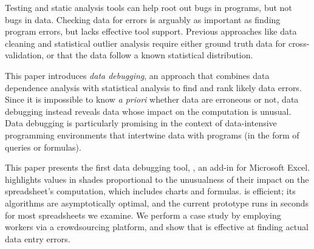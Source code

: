 Testing and static analysis tools can help root out bugs in programs,
but not bugs in data. Checking data for errors is arguably as
important as finding program errors, but lacks effective tool
support. Previous approaches like data cleaning and statistical
outlier analysis require either ground truth data for
cross-validation, or that the data follow a known statistical
distribution.

This paper introduces \emph{data debugging}, an approach that combines
data dependence analysis with statistical analysis to find and rank
likely data errors. Since it is impossible to know \emph{a priori}
whether data are erroneous or not, data debugging instead
reveals data whose impact on the computation is unusual.
Data debugging is particularly promising in the context of
data-intensive programming environments that intertwine data with
programs (in the form of queries or formulas).

This paper presents the first data debugging tool, \checkcell{}, an
add-in for Microsoft Excel. \checkcell{} highlights values in shades
proportional to the unusualness of their impact on the spreadsheet's
computation, which includes charts and formulas. \checkcell{} is efficient;
its algorithms are asymptotically optimal, and the current prototype
runs in seconds for most spreadsheets we examine. We perform a case
study by employing workers via a crowdsourcing platform, and show
that \checkcell{} is effective at finding actual data entry errors.

